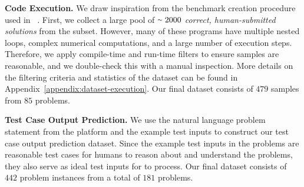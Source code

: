 \vspace{2pt}
\noindent \textbf{Code Execution.} 
We draw inspiration from the benchmark creation procedure used in ~\citep{gu2024cruxeval}. 
First, we collect a large pool of $\smallsim 2000$ \textit{correct, human-submitted solutions} from the \leetcode{} subset. 
However, many of these programs have multiple nested loops, complex numerical computations, and a large number of execution steps. 
Therefore, we apply compile-time and run-time filters to ensure samples are reasonable, and we double-check this with a manual inspection. 
More details on the filtering criteria and statistics of the dataset can be found in Appendix~\ref{appendix:dataset-execution}. 
Our final dataset consists of $479$ samples from $85$ problems.

\vspace{2pt}
\noindent \textbf{Test Case Output Prediction.} 
We use the natural language problem statement from the \leetcode{} platform and the example test inputs to construct our test case output prediction dataset.
Since the example test inputs in the problems are reasonable test cases for humans to reason about and understand the problems, they also serve as ideal test inputs for \llms{} to process.
Our final dataset consists of $442$ problem instances from a total of $181$ \leetcode{} problems.

